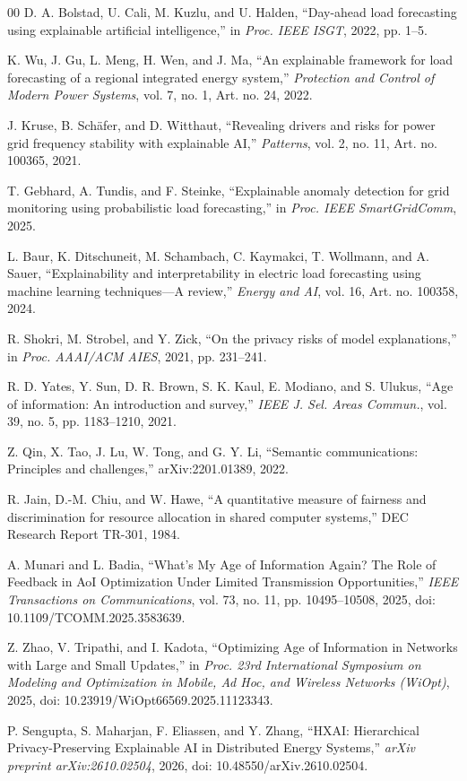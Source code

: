 \documentclass[conference]{IEEEtran}
\begin{document}
\begin{thebibliography}{00}
D. A. Bolstad, U. Cali, M. Kuzlu, and U. Halden, ``Day-ahead load
forecasting using explainable artificial intelligence,'' in
\emph{Proc. IEEE ISGT}, 2022, pp. 1--5.

K. Wu, J. Gu, L. Meng, H. Wen, and J. Ma, ``An explainable framework
for load forecasting of a regional integrated energy system,''
\emph{Protection and Control of Modern Power Systems}, vol. 7, no. 1,
Art. no. 24, 2022.

J. Kruse, B. Sch\"afer, and D. Witthaut, ``Revealing drivers and risks
for power grid frequency stability with explainable AI,'' \emph{Patterns},
vol. 2, no. 11, Art. no. 100365, 2021.

T. Gebhard, A. Tundis, and F. Steinke, ``Explainable anomaly detection
for grid monitoring using probabilistic load forecasting,'' in
\emph{Proc. IEEE SmartGridComm}, 2025.

L. Baur, K. Ditschuneit, M. Schambach, C. Kaymakci, T. Wollmann, and
A. Sauer, ``Explainability and interpretability in electric load
forecasting using machine learning techniques---A review,'' \emph{Energy
and AI}, vol. 16, Art. no. 100358, 2024.

R. Shokri, M. Strobel, and Y. Zick, ``On the privacy risks of model
explanations,'' in \emph{Proc. AAAI/ACM AIES}, 2021, pp. 231--241.

R. D. Yates, Y. Sun, D. R. Brown, S. K. Kaul, E. Modiano, and S. Ulukus,
``Age of information: An introduction and survey,'' \emph{IEEE J. Sel.
Areas Commun.}, vol. 39, no. 5, pp. 1183--1210, 2021.

Z. Qin, X. Tao, J. Lu, W. Tong, and G. Y. Li, ``Semantic communications:
Principles and challenges,'' arXiv:2201.01389, 2022.

R. Jain, D.-M. Chiu, and W. Hawe, ``A quantitative measure of fairness
and discrimination for resource allocation in shared computer systems,''
DEC Research Report TR-301, 1984.

A. Munari and L. Badia, ``What's My Age of Information Again? The Role of Feedback
in AoI Optimization Under Limited Transmission Opportunities,''
\emph{IEEE Transactions on Communications},
vol. 73, no. 11, pp. 10495--10508, 2025,
doi: 10.1109/TCOMM.2025.3583639.

Z. Zhao, V. Tripathi, and I. Kadota, ``Optimizing Age of Information in Networks with Large
and Small Updates,''
in \emph{Proc. 23rd International Symposium on Modeling
and Optimization in Mobile, Ad Hoc, and Wireless
Networks (WiOpt)}, 2025,
doi: 10.23919/WiOpt66569.2025.11123343.

P. Sengupta, S. Maharjan, F. Eliassen, and Y. Zhang,
``HXAI: Hierarchical Privacy-Preserving Explainable AI
in Distributed Energy Systems,''
\emph{arXiv preprint arXiv:2610.02504}, 2026,
doi: 10.48550/arXiv.2610.02504.


\end{thebibliography}
\end{document}
